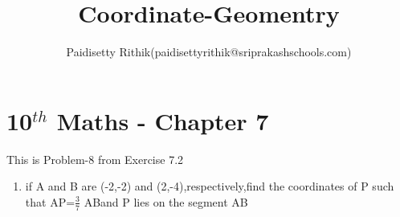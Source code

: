 \documentclass[12pt]{article}
\title{Coordinate-Geomentry}
\author{Paidisetty Rithik(paidisettyrithik@sriprakashschools.com)}
\begin{document}
\maketitle
\section*{10$^{th}$ Maths - Chapter 7}
This is Problem-8 from Exercise 7.2
\begin{enumerate}
\item if A and B are (-2,-2) and (2,-4),respectively,find the coordinates of P such that
AP=$\frac{3}{7}$   ABand P lies on the segment AB \\

	

\end{enumerate}
\end{document}
